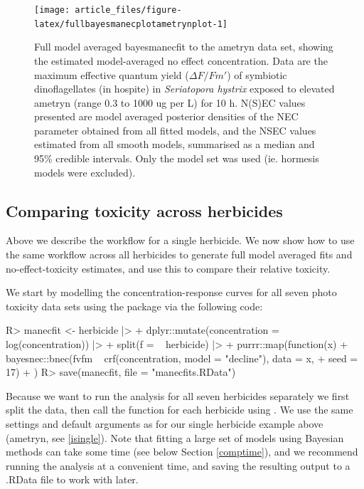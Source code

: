 \documentclass[
  shortnames]{jss}
\begin{document}
\begin{CodeChunk}
\begin{figure}[!ht]

{\centering \texttt{[image: article\_files/figure-latex/fullbayesmanecplotametrynplot-1]} 

}

\caption{Full model averaged bayesmanecfit to the ametryn data set, showing the estimated model-averaged no effect concentration. Data are the maximum effective quantum yield ($\Delta F / Fm'$) of symbiotic dinoflagellates (in hospite) in \textit{Seriatopora hystrix} exposed to elevated ametryn (range 0.3 to 1000 ug per L) for 10 h. N(S)EC values presented are model averaged posterior densities of the NEC parameter obtained from all fitted  models, and the NSEC values estimated from all smooth  models, summarised as a median and 95\% credible intervals. Only the  model set was used (ie. hormesis models were excluded).}\label{fig:fullbayesmanecplotametrynplot}
\end{figure}
\end{CodeChunk}

\subsection[Comparing toxicity]{Comparing toxicity across herbicides}\label{iall}

Above we describe the workflow for a single herbicide. We now show how to use the same workflow across all herbicides to generate full  model averaged fits and no-effect-toxicity estimates, and use this to compare their relative toxicity.

We start by modelling the concentration-response curves for all seven photo toxicity data sets using the  package via the following code:

\begin{CodeChunk}
\begin{CodeInput}
R> manecfit <- herbicide |>
+   dplyr::mutate(concentration = log(concentration)) |>
+   split(f = ~ herbicide) |>
+   purrr::map(function(x) {
+     bayesnec::bnec(fvfm ~ crf(concentration, model = "decline"), data = x,
+                    seed = 17)
+   })
R> save(manecfit, file = "manecfits.RData")
\end{CodeInput}
\end{CodeChunk}

Because we want to run the analysis for all seven herbicides separately we first split the data, then call the  function for each herbicide using  \citep{purrr}. We use the same settings and default arguments as for our single herbicide example above (ametryn, see \ref{isingle}). Note that fitting a large set of models using Bayesian methods can take some time (see below Section \ref{comptime}), and we recommend running the analysis at a convenient time, and saving the resulting output to a .RData file to work with later.
\end{document}
